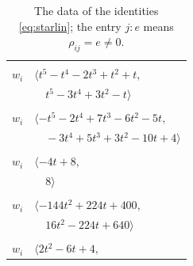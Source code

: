 \documentclass[11pt]{article}
\begin{document}
\begingroup\scriptsize
\setlength{\LTcapwidth}{\textwidth}
\begin{longtable}{@{}ll@{}}
\caption{The data of the identities \eqref{eq:starlin}; the entry $j{:}e$ means $\rho_{ij}=e\neq0$.}\label{tab:star}\\
\hline\endfirsthead\hline\endhead\hline\endfoot
\multicolumn{2}{@{}p{0.97\textwidth}@{}}{$i=0$, $D_i=1$, $\rho_{ij}$: $7{:}2, \allowbreak 13{:}1, \allowbreak 18{:}1, \allowbreak 19{:}1, \allowbreak 25{:}2, \allowbreak 27{:}2, \allowbreak 29{:}2, \allowbreak 33{:}1$}\\
$w_i$ & $\langle t^{5}-t^{4}-2t^{3}+t^{2}+t,$\\
 & $\quad t^{5}-3t^{4}+3t^{2}-t\rangle$\\
\addlinespace[2pt]
\multicolumn{2}{@{}p{0.97\textwidth}@{}}{$i=1$, $D_i=1$, $\rho_{ij}$: $8{:}1, \allowbreak 12{:}1, \allowbreak 15{:}1, \allowbreak 18{:}1, \allowbreak 19{:}2, \allowbreak 23{:}2, \allowbreak 36{:}1, \allowbreak 40{:}2, \allowbreak 42{:}2$}\\
$w_i$ & $\langle -t^{5}-2t^{4}+7t^{3}-6t^{2}-5t,$\\
 & $\quad -3t^{4}+5t^{3}+3t^{2}-10t+4\rangle$\\
\addlinespace[2pt]
\multicolumn{2}{@{}p{0.97\textwidth}@{}}{$i=2$, $D_i=1$, $\rho_{ij}$: $8{:}1, \allowbreak 9{:}1, \allowbreak 23{:}1, \allowbreak 25{:}1, \allowbreak 26{:}1, \allowbreak 27{:}2, \allowbreak 29{:}1, \allowbreak 37{:}1, \allowbreak 38{:}2, \allowbreak 40{:}1, \allowbreak 43{:}2$}\\
$w_i$ & $\langle -4t+8,$\\
 & $\quad 8\rangle$\\
\addlinespace[2pt]
\multicolumn{2}{@{}p{0.97\textwidth}@{}}{$i=3$, $D_i=1$, $\rho_{ij}$: $8{:}2, \allowbreak 10{:}2, \allowbreak 17{:}2, \allowbreak 18{:}2, \allowbreak 19{:}2, \allowbreak 21{:}1, \allowbreak 23{:}1, \allowbreak 27{:}1, \allowbreak 29{:}1, \allowbreak 31{:}2, \allowbreak 35{:}1, \allowbreak 36{:}1, \allowbreak 37{:}1, \allowbreak 40{:}1$}\\
$w_i$ & $\langle -144t^{2}+224t+400,$\\
 & $\quad 16t^{2}-224t+640\rangle$\\
\addlinespace[2pt]
\multicolumn{2}{@{}p{0.97\textwidth}@{}}{$i=4$, $D_i=1$, $\rho_{ij}$: $8{:}1, \allowbreak 14{:}1, \allowbreak 17{:}1, \allowbreak 25{:}1, \allowbreak 28{:}2, \allowbreak 36{:}1, \allowbreak 39{:}2, \allowbreak 43{:}2$}\\
$w_i$ & $\langle 2t^{2}-6t+4,$\\

\end{longtable}
\end{document}
